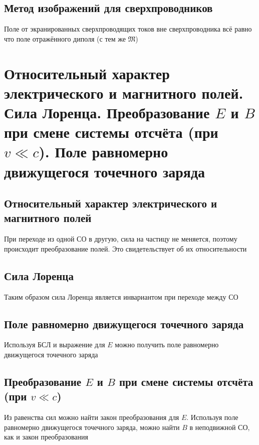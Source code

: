 \documentclass[a4paper, 14pt]{article}
\begin{document}
    \subsection{Метод изображений для сверхпроводников}
    
    Поле от экранированных сверхпроводящих токов вне сверхпроводника всё равно что поле отражённого диполя (с тем же
    $\mathfrak{M}$)
    
    \section{Относительный характер электрического и магнитного полей.
    Сила Лоренца.
    Преобразование $E$ и $B$ при смене системы отсчёта (при $v \ll c$).
    Поле равномерно движущегося точечного заряда}
    
    \subsection{Относительный характер электрического и магнитного полей}
    
    При переходе из одной СО в другую, сила на частицу не меняется, поэтому происходит преобразование полей.
    Это свидетельствует об их относительности
    
    \subsection{Сила Лоренца}
    
    Таким образом сила Лоренца является инвариантом при переходе между СО
    
    \subsection{Поле равномерно движущегося точечного заряда}
    
    Используя БСЛ и выражение для $E$ можно получить поле равномерно движущегося точечного заряда
    
    \subsection{Преобразование $E$ и $B$ при смене системы отсчёта (при $v \ll c$)}
    
    Из равенства сил можно найти закон преобразования для $E$.
    Используя поле равномерно движущегося точечного заряда, можно найти $B$ в неподвижной СО, как и закон преобразования
    
\end{document}
